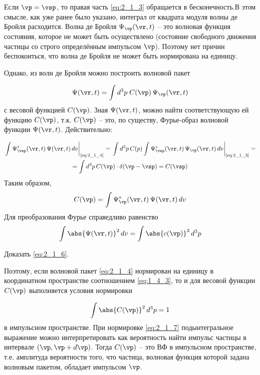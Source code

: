 Если $\vp=\vsp$, то правая часть \eqref{eq:2_1_3} обращается в бесконечность.В этом смысле, как уже ранее было указано, интеграл от квадрата модуля волны де Бройля расходится. Волна де Бройля $\Psi_{\vp}(\vr, t)$ -- это волновая функция состояния, которое не может быть осуществлено (состояние свободного движения частицы со строго определённым импульсом $\vp$). Поэтому нет причин беспокоиться, что волна де Бройля не может быть нормирована на единицу.

Однако, из волн де Бройля можно построить волновой пакет

\begin{equation}
\label{eq:2_1_4}
\Psi(\vr,t) = \int d^3p \; C(\vp) \, \Psi_{\vp}(\vr,t)
\end{equation}%
%
с весовой функцией $C(\vp)$. Зная $\Psi(\vr,t)$, можно найти соответствующую ей функцию $C(\vp)$, т.к. $C(\vp)$ -- это, по существу, Фурье-образ волновой функции $\Psi(\vr,t)$. Действительно:
%

$$
\begin{gathered}
\left. \int \Psi^*_{\vsp}(\vr,t) \, \Psi(\vr,t) \, dv \right|_{\text{\eqref{eq:2_1_4}}} =
  \left. \int d^3p \, C(p) \int \Psi^*_{\vsp}(\vr,t) \, \Psi_{\vp}(\vr,t) \, dv \right|_{\text{\eqref{eq:2_1_3}}} =\\
  = \int d^3p \, C(\vp) \cdot \delta (\vp - \vsp) = C(\vsp)
\end{gathered}
$$%
%
Таким образом,
\begin{equation}
\label{eq:2_1_5}
C(\vp) = \int\Psi^*_{\vp}(\vr,t) \, \Psi(\vr,t) \, dv
\end{equation}%
%
Для преобразования Фурье справедливо равенство
\begin{equation}
\label{eq:2_1_6}
\int \abs{ \Psi(\vr,t) }^2 \, dv = \int \abs{c(\vp)}^2 \, d^3 p
\end{equation}

\begin{excr}
Доказать \eqref{eq:2_1_6}.
\end{excr}%

\noindent
Поэтому, если волновой пакет \eqref{eq:2_1_4} нормирован на единицу в координатном пространстве соотношением \eqref{eq:1_4_3}, то и для весовой функции $C(\vp)$ выполняется условия нормировки

\begin{equation}
\label{eq:2_1_7}
\int \abs{C(\vp)}^2 \, d^3 p = 1
\end{equation}%
%
в импульсном пространстве. При нормировке \eqref{eq:2_1_7} подынтегральное выражение можно интерпретировать как вероятность найти импульс частицы в интервале $(\vp,\vp+d\vp)$. Тогда $C(\vp)$ -- это {ВФ в импульсном пространстве}, т.е. амплитуда вероятности того, что частица, волновая функция которой задана волновым пакетом, обладает импульсом $\vp$.

